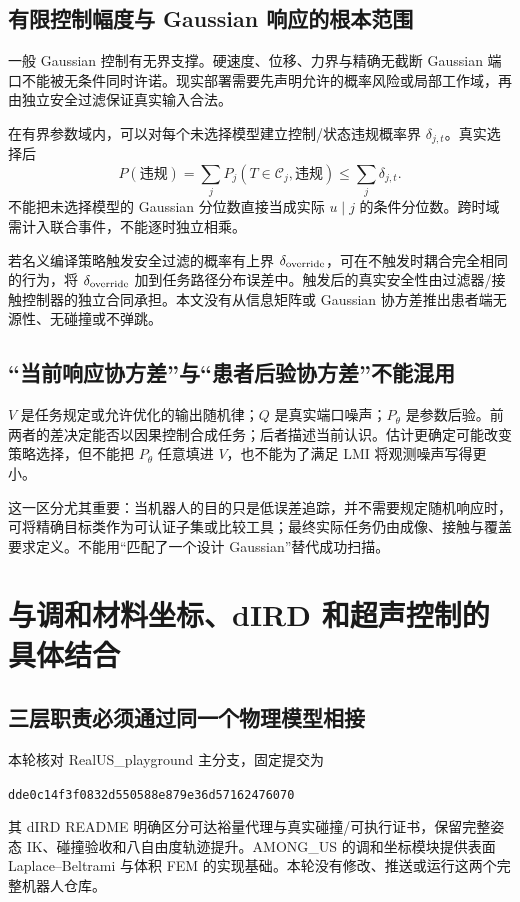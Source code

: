 \documentclass[UTF8,fontset=fandol,11pt,a4paper]{ctexart}
\theoremstyle{definition}\newtheorem{definition}[theorem]{定义}\newtheorem{assumption}[theorem]{条件}
\numberwithin{equation}{section}
\begin{document}
\subsection{有限控制幅度与 Gaussian 响应的根本范围}
一般 Gaussian 控制有无界支撑。硬速度、位移、力界与精确无截断 Gaussian 端口不能被无条件同时许诺。现实部署需要先声明允许的概率风险或局部工作域，再由独立安全过滤保证真实输入合法。

在有界参数域内，可以对每个未选择模型建立控制/状态违规概率界 $\delta_{j,t}$。真实选择后
\[
P(\text{违规})=\sum_jP_j(T\in\mathcal C_j,\text{违规})
\le\sum_j\delta_{j,t}.
\]
不能把未选择模型的 Gaussian 分位数直接当成实际 $u\mid j$ 的条件分位数。跨时域需计入联合事件，不能逐时独立相乘。

若名义编译策略触发安全过滤的概率有上界 $\delta_{\rm override}$，可在不触发时耦合完全相同的行为，将 $\delta_{\rm override}$ 加到任务路径分布误差中。触发后的真实安全性由过滤器/接触控制器的独立合同承担。本文没有从信息矩阵或 Gaussian 协方差推出患者端无源性、无碰撞或不弹跳。

\subsection{“当前响应协方差”与“患者后验协方差”不能混用}
$V$ 是任务规定或允许优化的输出随机律；$Q$ 是真实端口噪声；$P_\theta$ 是参数后验。前两者的差决定能否以因果控制合成任务；后者描述当前认识。估计更确定可能改变策略选择，但不能把 $P_\theta$ 任意填进 $V$，也不能为了满足 LMI 将观测噪声写得更小。

这一区分尤其重要：当机器人的目的只是低误差追踪，并不需要规定随机响应时，可将精确目标类作为可认证子集或比较工具；最终实际任务仍由成像、接触与覆盖要求定义。不能用“匹配了一个设计 Gaussian”替代成功扫描。

\section{与调和材料坐标、dIRD 和超声控制的具体结合}
\label{sec:integration}
\subsection{三层职责必须通过同一个物理模型相接}
本轮核对 RealUS\_playground 主分支，固定提交为
\begin{center}\small\texttt{dde0c14f3f0832d550588e879e36d57162476070}\end{center}
其 dIRD README 明确区分可达裕量代理与真实碰撞/可执行证书，保留完整姿态 IK、碰撞验收和八自由度轨迹提升\cite{realus}。AMONG\_US 的调和坐标模块提供表面 Laplace--Beltrami 与体积 FEM 的实现基础\cite{among}。本轮没有修改、推送或运行这两个完整机器人仓库。
\end{document}
